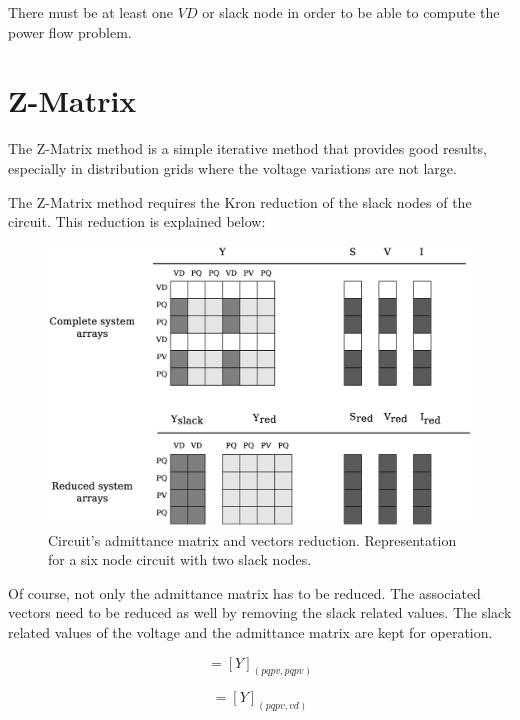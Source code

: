 \documentclass[nols,a4paper,twoside,notoc,fleqn]{tufte-book}
\begin{document}
There must be at least one $VD$ or slack node in order to be able to compute the power flow problem. 



\section{Z-Matrix}

The Z-Matrix method is a simple iterative method that provides good results, especially in distribution grids where the voltage variations are not large.

The Z-Matrix method requires the Kron reduction of the slack nodes of the circuit. This reduction is explained below:

\begin{figure}[h!]
  \includegraphics[width=\linewidth]{img/Matrix_reduction.eps}
  \caption{Circuit's admittance matrix and vectors reduction. Representation for a six node circuit with two slack nodes.}
  \label{fig:reduction}
\end{figure}

Of course, not only the admittance matrix has to be reduced. The associated vectors need to be reduced as well by removing the slack related values. The slack related values of the voltage and the admittance matrix are kept for operation. 

\begin{equation}
[Y_{red}] = [Y]_{(pqpv, pqpv)}
\end{equation}

\begin{equation}
[Y_{slack}] = [Y]_{(pqpv, vd)}
\end{equation}
\end{document}
